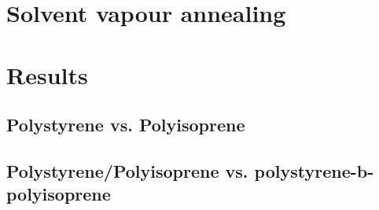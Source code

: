 \documentclass[MasterThesisMain.tex]{subfiles}
\begin{document}
\section{Solvent vapour annealing}

\section{Results}

\subsection{Polystyrene vs. Polyisoprene}

\subsection{Polystyrene/Polyisoprene vs. polystyrene-b-polyisoprene}
\end{document}

